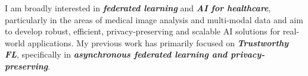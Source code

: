 

\begin{cvparagraph}


I am broadly interested in \textcolor{awesome-darknight}{\textit{\textbf{federated learning}}} and \textcolor{awesome-darknight}{\textit{\textbf{AI for healthcare}}}, particularly in the areas of medical image analysis and multi-modal data and aim to develop robust, efficient, privacy-preserving and scalable AI solutions for real-world applications.
My previous work has primarily focused on \textcolor{awesome-darknight}{\textit{\textbf{Trustworthy FL}}}, specifically in \textcolor{awesome-darknight}{\textit{\textbf{asynchronous federated learning and privacy-preserving}}}.

\end{cvparagraph}
